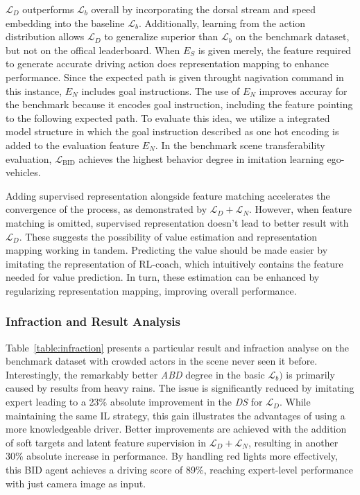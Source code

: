 \documentclass[preprint,12pt]{elsarticle}
\begin{document}
$\mathcal{L}_D$ outperforms $\mathcal{L}_b$ overall by incorporating the dorsal stream and speed embedding into the baseline $\mathcal{L}_b$.
Additionally, learning from the action distribution allows $\mathcal{L}_D$ to generalize superior than $\mathcal{L}_b$ on the benchmark dataset, but not on the offical leaderboard.
When $E_S$ is given merely, the feature required to generate accurate driving action does representation mapping to enhance performance.
Since the expected path is given throught nagivation command in this instance, $E_N$ includes goal instructions.
The use of $E_N$ improves accuray for the benchmark because it encodes goal instruction, including the feature pointing to the following expected path.
To evaluate this idea, we utilize a integrated model structure in which the goal instruction described as one hot encoding is added to the evaluation feature $E_N$.
In the benchmark scene transferability evaluation, $\mathcal{L}_\text{BID}$ achieves the highest behavior degree in imitation learning ego-vehicles.



%
Adding supervised representation alongside feature matching accelerates the convergence of the process, as demonstrated by $\mathcal{L}_D + \mathcal{L}_N$.
However, when feature matching is omitted, supervised representation doesn't lead to better result with $\mathcal{L}_D$.
These suggests the possibility of value estimation and representation mapping working in tandem.
Predicting the value should be made easier by imitating the representation of RL-coach, which intuitively contains the feature needed for value prediction. 
In turn, these estimation can be enhanced by regularizing representation mapping, improving overall performance.


\subsubsection{Infraction and Result Analysis}


\hspace{1pc}Table~\ref{table:infraction} presents a particular result and infraction analyse on the benchmark dataset with crowded actors in the scene never seen it before. 
Interestingly, the remarkably better \emph{ABD} degree in the basic $\mathcal{L}_b)$ is primarily caused by results from heavy rains. 
The issue is significantly reduced by imitating expert leading to a 23\% absolute improvement in the \emph{DS} for $\mathcal{L}_D$.
While maintaining the same IL strategy, this gain illustrates the advantages of using a more knowledgeable driver. 
Better improvements are achieved with the addition of soft targets and latent feature supervision in $\mathcal{L}_D+\mathcal{L}_N$, resulting in another 30\% absolute increase in performance. 
By handling red lights more effectively, this BID agent achieves a driving score of 89\%, reaching expert-level performance with just camera image as input.
\end{document}
